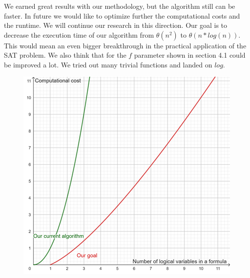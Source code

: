 \documentclass{article}
\begin{document}
We earned great results with our methodology, but the algorithm still can be faster.
In future we would like to optimize further the computational costs and the runtime.
We will continue our research in this direction. 
Our goal is to decrease the execution time of our algorithm from $\theta(n^2)$ to $\theta (n*log(n))$. This would mean an even bigger breakthrough in the practical application of the SAT problem. We also think that for the $f$ parameter shown in section 4.1 could be improved a lot. We tried out many trivial functions and landed on $log$.
\begin{figure}[h]
    \centering
    \includegraphics[width=0.5\linewidth]{img/futurework.png}
\end{figure}



\end{document}
